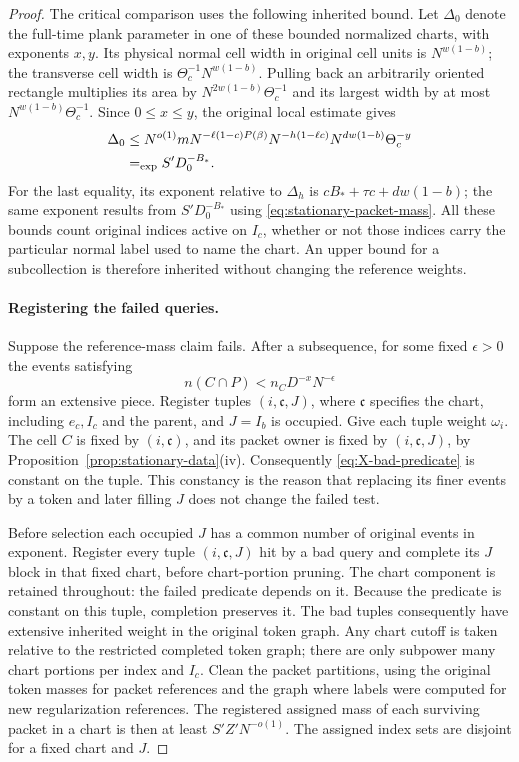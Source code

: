 \begin{proof}
The critical comparison uses the following inherited bound. Let
$\Delta_0$ denote the full-time plank parameter in
one of these bounded normalized charts, with exponents $x,y$. Its
physical normal cell width in original cell units is $N^{w(1-b)}$;
the transverse cell width is
$\Theta_c^{-1}N^{w(1-b)}$. Pulling back an arbitrarily oriented
rectangle multiplies its area by
$N^{2w(1-b)}\Theta_c^{-1}$ and its largest width by at most
$N^{w(1-b)}\Theta_c^{-1}$. Since $0\le x\le y$, the original
local estimate gives
\begin{align}
 \Delta_0
 &\le N^{o(1)}mN^{-\ell(1-c)P(\beta)}
       N^{-h(1-\ell c)}N^{dw(1-b)}\Theta_c^{-y}
       \notag\\
 &\mathrel{=_{\mathrm{exp}}} S'D_0^{-B_*}.
\label{eq:X-chart-clustering}
\end{align}
For the last equality, its exponent relative to $\Delta_h$ is
$cB_*+\tau c+dw(1-b)$; the same exponent results from
$S'D_0^{-B_*}$ using \eqref{eq:stationary-packet-mass}.
All these bounds count original indices active on $I_c$, whether or
not those indices carry the particular normal label used to name
the chart. An upper bound for a subcollection is therefore inherited
without changing the reference weights.

\paragraph{Registering the failed queries.}
Suppose the reference-mass claim fails. After a subsequence, for some
fixed $\epsilon>0$
the events satisfying
\begin{equation}
 n(C\cap P)<n_CD^{-x}N^{-\epsilon}
\label{eq:X-bad-predicate}
\end{equation}
form an extensive piece. Register tuples $(i,\mathfrak c,J)$,
where $\mathfrak c$ specifies the chart, including $e_c,I_c$ and
the parent, and $J=I_b$ is occupied. Give each tuple weight
$\omega_i$. The cell $C$ is fixed by $(i,\mathfrak c)$, and its
packet owner is fixed by $(i,\mathfrak c,J)$, by
Proposition~\ref{prop:stationary-data}(iv). Consequently
\eqref{eq:X-bad-predicate} is constant on the tuple. This constancy
is the reason that replacing its finer events by a token and later
filling $J$ does not change the failed test.

Before selection each occupied $J$ has a common number of original
events in exponent. Register every tuple $(i,\mathfrak c,J)$ hit by
a bad query and complete its $J$ block in that fixed chart, before
chart-portion pruning. The chart component is retained throughout:
the failed predicate depends on it. Because the predicate is constant
on this tuple, completion preserves it. The
bad tuples consequently have extensive inherited weight in the
original token graph. Any chart cutoff is taken relative to the
restricted completed token graph; there are only subpower many
chart portions per index and $I_c$. Clean the packet partitions,
using the original token masses for packet references and the graph
where labels were computed for new regularization references.
The registered assigned mass of each surviving packet in a chart
is then at least $S'Z'N^{-o(1)}$. The assigned index sets are
disjoint for a fixed chart and $J$.


\end{proof}
